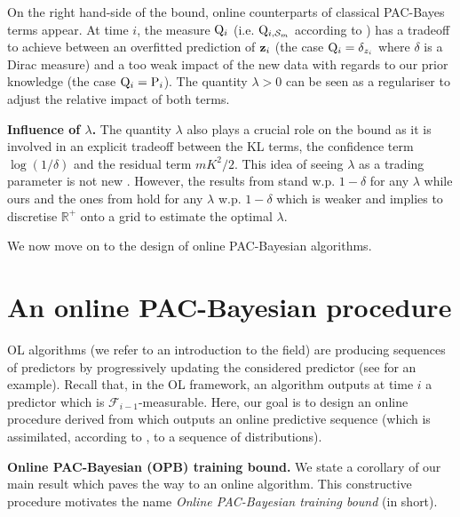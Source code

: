   On the right hand-side of the bound, online counterparts of classical PAC-Bayes terms appear. At time $i$, the measure $\mathrm{Q}_{i}$ (i.e. $\mathrm{Q}_{i,\mathcal{S}_m}$ according to ) has a tradeoff to achieve between an overfitted prediction of $\mathbf{z}_i$ (the case $\mathrm{Q}_{i}=\delta_{z_i}$ where $\delta$ is a Dirac measure) and a too weak impact of the new data with regards to our prior knowledge (the case $\mathrm{Q}_{i}=\mathrm{P}_{i}$). The quantity $\lambda>0$ can be seen as a regulariser to adjust the relative impact of both terms.


\textbf{Influence of $\lambda$.}
The quantity $\lambda$ also plays a crucial role on the bound as it is involved in an explicit tradeoff between the KL terms, the confidence term $\log(1/\delta)$ and the residual term $mK^2/2$. This idea of seeing $\lambda$ as a trading parameter is not new \citep{thiemann2017strongly,germain2016pac}.
 However, the results from \citet{thiemann2017strongly} stand w.p. $1-\delta $ for any $\lambda$ while ours and the ones from \citet{germain2016pac} hold for any $\lambda$ w.p. $1-\delta$ which is weaker and implies to discretise $\mathbb{R}^+$ onto a grid to estimate the optimal $\lambda$.

We now move on to the design of online PAC-Bayesian algorithms.


\section{An online PAC-Bayesian procedure}

\label{sec: online_pacb_procedure}

OL algorithms (we refer to \citealp{hazan2016introduction}  an introduction to the field) are producing sequences of predictors by progressively updating the considered predictor (see  for an example). Recall that, in the OL framework, an algorithm outputs at time $i$ a predictor which is $\mathcal{F}_{i-1}$-measurable. Here, our goal is to design an online procedure derived from  which outputs an online predictive sequence (which is assimilated, according to , to a sequence of distributions).


\textbf{Online PAC-Bayesian (OPB) training bound.} We state a corollary of our main result which paves the way to an online algorithm. This constructive procedure motivates the name \emph{ Online PAC-Bayesian training bound} (\OPBTrain in short).

